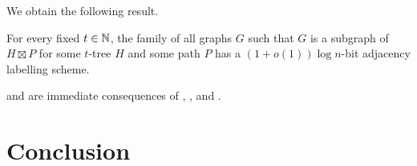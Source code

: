 \documentclass[10pt, conference, compsocconf]{IEEEtran}
\let\le\leqslant
\begin{document}




We obtain the following result.

\begin{thm}
  For every fixed $t\in\mathbb{N}$, the family of all graphs $G$ such that $G$ is a subgraph of $H\boxtimes P$ for some $t$-tree $H$ and some path $P$ has a $(1+o(1))\log n$-bit adjacency labelling scheme.
\end{thm}

 and  are immediate consequences of , , and .





\section{Conclusion}
\end{document}
